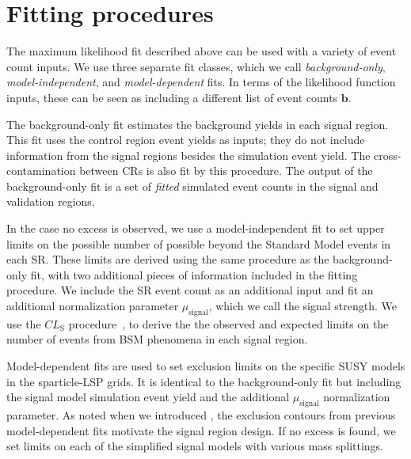 \section{Fitting procedures}

The maximum likelihood fit described above can be used with a variety of event count inputs.
We use three separate fit classes, which we call \textit{background-only}, \textit{model-independent}, and \textit{model-dependent} fits.
In terms of the likelihood function inputs, these can be seen as including a different list of event counts $\bm{b}$.

The background-only fit estimates the background yields in each signal region.
This fit uses the control region event yields as inputs; they do not include information from the signal regions besides the simulation event yield.
The cross-contamination between CRs is also fit by this procedure.
The output of the background-only fit is a set of \textit{fitted} simulated event counts in the signal and validation regions,

In the case no excess is observed, we use a model-independent fit to set upper limits on the possible number of possible beyond the Standard Model events in each SR.
These limits are derived using the same procedure as the background-only fit, with two additional pieces of information included in the fitting procedure.
We include the SR event count as an additional input and fit an additional normalization parameter $\mu_{\text{signal}}$, which we call the signal strength.
We use the $CL_{\mathrm{S}}$ procedure~\cite{Feldman:1997qc}, to derive the the observed and expected limits on the number of events from BSM phenomena in each signal region.

Model-dependent fits are used to set exclusion limits on the specific SUSY models in the sparticle-LSP grids.
It is identical to the background-only fit but including the signal model simulation event yield and the additional $\mu_{\text{signal}}$ normalization parameter.
As noted when we introduced , the exclusion contours from previous model-dependent fits motivate the signal region design.
If no excess is found, we set limits on each of the simplified signal models with various mass splittings.